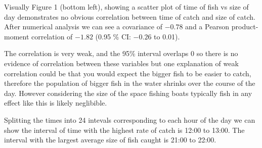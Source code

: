 \documentclass{article}\usepackage[]{graphicx}\usepackage[]{color}
\begin{document}
Visually Figure 1 (bottom left), showing a scatter plot of time of fish vs size of day demonstrates no obvious correlation between time of catch and size of catch. After numerical analysis we can see a covariance of \ensuremath{-0.78} and a Pearson product-moment correlation of \ensuremath{-1.82} (0.95 \% CI: \ensuremath{-0.26} to 0.01).

The correlation is very weak, and the 95\% interval overlaps 0 so there is no evidence of correlation between these variables but one explanation of weak correlation could be that you would expect the bigger fish to be easier to catch, therefore the population of bigger fish in the water shrinks over the course of the day. However considering the size of the space fishing boats typically fish in any effect like this is likely neglibible.  


Splitting the times into 24 intevals corresponding to each hour of the day we can show the interval of time with the highest rate of catch is 12:00 to  13:00. The interval with the largest average size of fish caught is 21:00 to 22:00. 
\end{document}
